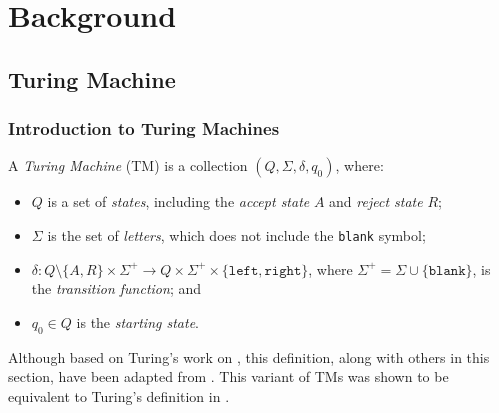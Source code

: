 \chapter{Background}
\section{Turing Machine}
\subsection{Introduction to Turing Machines}
A \emph{Turing Machine} (TM) is a collection $(Q, \Sigma, \delta, q_0)$, where:
\begin{itemize}
    \item $Q$ is a set of \emph{states}, including the \emph{accept state} $A$ and \emph{reject state} $R$;
    \item $\Sigma$ is the set of \emph{letters}, which does not include the \texttt{blank} symbol;
    \item $\delta \colon Q \setminus \{A, R\} \times \Sigma^+ \to Q \times \Sigma^+ \times \{\texttt{left}, \texttt{right}\}$, where $\Sigma^+ = \Sigma \cup \{\texttt{blank}\}$, is the \emph{transition function}; and
    \item $q_0 \in Q$ is the \emph{starting state}.
\end{itemize}
Although based on Turing's work on \cite{turing1936computable}, this definition, along with others in this section, have been adapted from \cite{hopcroft2001automata}. This variant of TMs was shown to be equivalent to Turing's definition in \cite{wang1957variant}.

